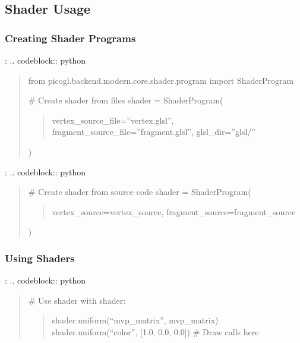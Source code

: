 \documentclass[a4paper,10pt,english,openany,oneside]{sphinxmanual}
\begin{document}
\subsection{Shader Usage}
\label{\detokenize{api/shaders:shader-usage}}

\subsubsection{Creating Shader Programs}
\label{\detokenize{api/shaders:creating-shader-programs}}
\sphinxAtStartPar
{}:
.. code\sphinxhyphen{}block:: python
\begin{quote}

\sphinxAtStartPar
from picogl.backend.modern.core.shader.program import ShaderProgram

\sphinxAtStartPar
\# Create shader from files
shader = ShaderProgram(
\begin{quote}

\sphinxAtStartPar
vertex\_source\_file=”vertex.glsl”,
fragment\_source\_file=”fragment.glsl”,
glsl\_dir=”glsl/”
\end{quote}

\sphinxAtStartPar
)
\end{quote}

\sphinxAtStartPar
{}:
.. code\sphinxhyphen{}block:: python
\begin{quote}

\sphinxAtStartPar
\# Create shader from source code
shader = ShaderProgram(
\begin{quote}

\sphinxAtStartPar
vertex\_source=vertex\_source,
fragment\_source=fragment\_source
\end{quote}

\sphinxAtStartPar
)
\end{quote}


\subsubsection{Using Shaders}
\label{\detokenize{api/shaders:using-shaders}}
\sphinxAtStartPar
{}:
.. code\sphinxhyphen{}block:: python
\begin{quote}

\sphinxAtStartPar
\# Use shader
with shader:
\begin{quote}

\sphinxAtStartPar
shader.uniform(“mvp\_matrix”, mvp\_matrix)
shader.uniform(“color”, {[}1.0, 0.0, 0.0{]})
\# Draw calls here
\end{quote}
\end{quote}
\end{document}
